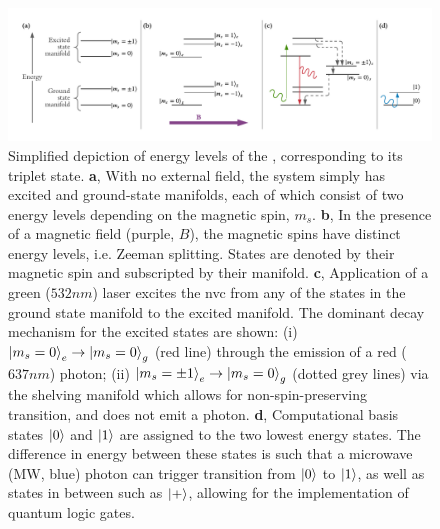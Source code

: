 \begin{figure}
    \begin{center}
        \includegraphics[width=0.8\linewidth]{experimental_study/figures/nv_centre_cartoon.pdf}
    \end{center}
    \caption[ energy levels.]{
        Simplified depiction of energy levels of the , corresponding to its triplet state. 
        \textbf{a}, With no external field, the system simply has excited and ground-state manifolds, 
        each of which consist of two energy levels depending on the magnetic spin, $m_s$.
        \textbf{b}, In the presence of a magnetic field (purple, $B$), the magnetic spins have distinct energy levels, 
        i.e. Zeeman splitting. 
        States are denoted by their magnetic spin and subscripted by their manifold. 
        \textbf{c},  Application of a green ($532nm$) laser excites the \gls{nvc} from any of the states in the 
        ground state manifold to the excited manifold. 
        The dominant decay mechanism for the excited states are shown: 
            (i) $\ket{m_s=0}_e \rightarrow \ket{m_s=0}_g$ (red line) through the emission of a red ($637nm$) photon;
            (ii) $\ket{m_s=\pm 1}_e \rightarrow \ket{m_s=0}_g$ (dotted grey lines) via the shelving manifold which allows for non-spin-preserving transition, 
            and does not emit a photon. 
        \textbf{d}, Computational basis states $\ket{0}$ and $\ket{1}$ are assigned to the two lowest energy states.
            The difference in energy between these states is such that a microwave (MW, blue) photon
            can trigger transition from $\ket{0}$ to $\ket{1}$, as well as states in between such as $\ket{+}$, 
            allowing for the implementation of quantum logic gates. 
    }
    \label{fig:nv_centre_energy_levels}
\end{figure}


